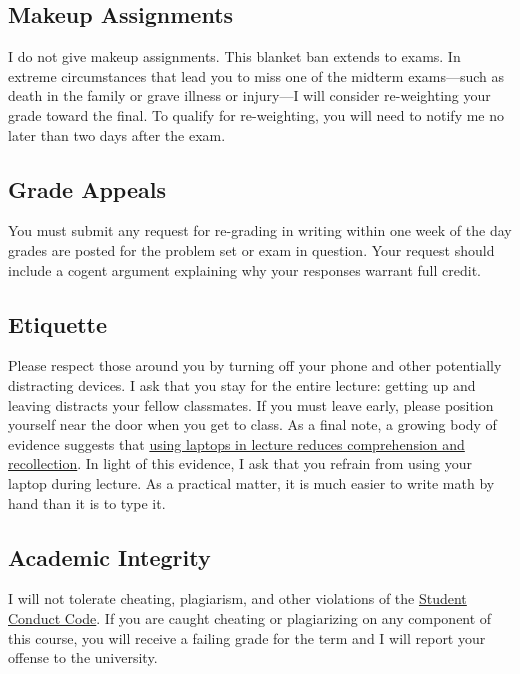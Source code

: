 \documentclass[10pt]{article}
\begin{document}
\subsection*{Makeup Assignments} 

I do not give makeup assignments. This blanket ban extends to exams. In extreme circumstances that lead you to miss one of the midterm exams---such as death in the family or grave illness or injury---I will consider re-weighting your grade toward the final. To qualify for re-weighting, you will need to notify me no later than two days after the exam.

\subsection*{Grade Appeals} 

You must submit any request for re-grading in writing within one week of the day grades are posted for the problem set or exam in question. Your request should include a cogent argument explaining why your responses warrant full credit.

\subsection*{Etiquette} 

Please respect those around you by turning off your phone and other potentially distracting devices. 
I ask that you stay for the entire lecture: getting up and leaving distracts your fellow classmates. 
If you must leave early, please position yourself near the door when you get to class. 
As a final note, a growing body of evidence suggests that \href{https://www.theverge.com/2017/11/27/16703904/laptop-learning-lecture}{using laptops in lecture reduces comprehension and recollection}. In light of this evidence, I ask that you refrain from using your laptop during lecture. 
As a practical matter, it is much easier to write math by hand than it is to type it. 

\subsection*{Academic Integrity} 

I will not tolerate cheating, plagiarism, and other violations of the \href{https://studentlife.uoregon.edu/conduct}{Student Conduct Code}. If you are caught cheating or plagiarizing on any component of this course, you will receive a failing grade for the term and I will report your offense to the university. 
\end{document}

